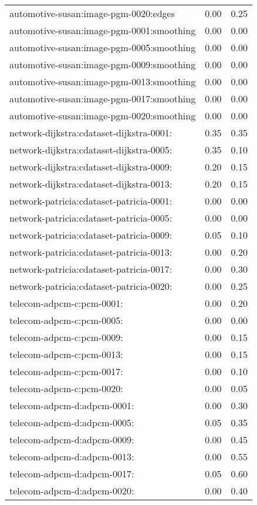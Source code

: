 \begin{longtable}{lrr}
automotive-susan:image-pgm-0020:edges & 0.00 & 0.25 \\
automotive-susan:image-pgm-0001:smoothing & 0.00 & 0.00 \\
automotive-susan:image-pgm-0005:smoothing & 0.00 & 0.00 \\
automotive-susan:image-pgm-0009:smoothing & 0.00 & 0.00 \\
automotive-susan:image-pgm-0013:smoothing & 0.00 & 0.00 \\
automotive-susan:image-pgm-0017:smoothing & 0.00 & 0.00 \\
automotive-susan:image-pgm-0020:smoothing & 0.00 & 0.00 \\
network-dijkstra:cdataset-dijkstra-0001: & 0.35 & 0.35 \\
network-dijkstra:cdataset-dijkstra-0005: & 0.35 & 0.10 \\
network-dijkstra:cdataset-dijkstra-0009: & 0.20 & 0.15 \\
network-dijkstra:cdataset-dijkstra-0013: & 0.20 & 0.15 \\
network-patricia:cdataset-patricia-0001: & 0.00 & 0.00 \\
network-patricia:cdataset-patricia-0005: & 0.00 & 0.00 \\
network-patricia:cdataset-patricia-0009: & 0.05 & 0.10 \\
network-patricia:cdataset-patricia-0013: & 0.00 & 0.20 \\
network-patricia:cdataset-patricia-0017: & 0.00 & 0.30 \\
network-patricia:cdataset-patricia-0020: & 0.00 & 0.25 \\
telecom-adpcm-c:pcm-0001: & 0.00 & 0.20 \\
telecom-adpcm-c:pcm-0005: & 0.00 & 0.00 \\
telecom-adpcm-c:pcm-0009: & 0.00 & 0.15 \\
telecom-adpcm-c:pcm-0013: & 0.00 & 0.15 \\
telecom-adpcm-c:pcm-0017: & 0.00 & 0.10 \\
telecom-adpcm-c:pcm-0020: & 0.00 & 0.05 \\
telecom-adpcm-d:adpcm-0001: & 0.00 & 0.30 \\
telecom-adpcm-d:adpcm-0005: & 0.05 & 0.35 \\
telecom-adpcm-d:adpcm-0009: & 0.00 & 0.45 \\
telecom-adpcm-d:adpcm-0013: & 0.00 & 0.55 \\
telecom-adpcm-d:adpcm-0017: & 0.05 & 0.60 \\
telecom-adpcm-d:adpcm-0020: & 0.00 & 0.40 \\

\end{longtable}
